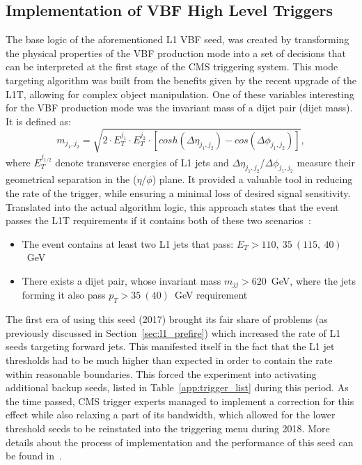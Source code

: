 \subsection{Implementation of VBF High Level Triggers}
\label{sec:vbf_implementation}
\hspace{10pt} The base logic of the aforementioned L1 VBF seed, was created by transforming the physical properties of the VBF production mode into a set of decisions that can be interpreted at the first stage of the CMS triggering system. This mode targeting algorithm was built from the benefits given by the recent upgrade of the L1T, allowing for complex object manipulation. One of these variables interesting for the VBF production mode was the invariant mass of a dijet pair (dijet mass). It is defined as:
\begin{equation}
    m_{j_1,j_2} = \sqrt{2\cdot E_T^{j_1}\cdot E_T^{j_2}\cdot [cosh(\Delta\eta_{j_1,j_2})-cos(\Delta\phi_{j_1,j_2})]},
\end{equation}
where $E_T^{j_{1/2}}$ denote transverse energies of L1 jets and $\Delta\eta_{j_1,j_2}$/$\Delta\phi_{j_1,j_2}$ measure their geometrical separation in the ($\eta$/$\phi$) plane. It provided a valuable tool in reducing the rate of the trigger, while ensuring a minimal loss of desired signal sensitivity. Translated into the actual algorithm logic, this approach states that the event passes the L1T requirements if it contains both of these two scenarios~\cite{cms:l1_paper}:
\begin{itemize}
    \item The event contains at least two L1 jets that pass: $E_T > 110,~35~(115,~40)$~GeV
    \item There exists a dijet pair, whose invariant mass $m_{jj}  > 620$~GeV, where the jets forming it also pass $p_T > 35~(40)$~GeV requirement
\end{itemize}
\hspace{10pt} The first era of using this seed (2017) brought its fair share of problems (as previously discussed in Section~\ref{sec:l1_prefire}) which increased the rate of L1 seeds targeting forward jets. This manifested itself in the fact that the L1 jet thresholds had to be much higher than expected in order to contain the rate within reasonable boundaries. This forced the experiment into activating additional backup seeds, listed in Table~\ref{app:trigger_list} during this period. As the time passed, CMS trigger experts managed to implement a correction for this effect while also relaxing a part of its bandwidth, which allowed for the lower threshold seeds to be reinstated into the triggering menu during 2018. More details about the process of implementation and the performance of this seed can be found in~\cite{cms:l1_paper,Chiara}.

